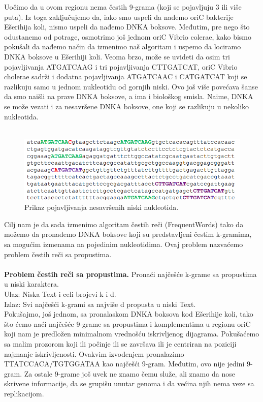 Uočimo da u ovom regionu nema čestih 9-grama (koji se pojavljuju 3 ili više puta). Iz toga zaključujemo da, iako smo uspeli da nađemo oriC bakterije Ešerihija koli, nismo uspeli da nađemo DNKA boksove. Međutim, pre nego što odustanemo od potrage, osmotrimo još jednom oriC Vibrio colerae, kako bismo pokušali da nađemo način da izmenimo naš algoritam i uspemo da lociramo DNKA boksove u Ešerihiji koli. Veoma brzo, može se uvideti da osim tri pojavljivanja ATGATCAAG i tri pojavljivanja CTTGATCAT, oriC Vibrio cholerae sadrži i dodatna pojavljivanja ATGATCAAC i CATGATCAT koji se razlikuju samo u jednom nukleotidu od gornjih niski. Ovo još više povećava šanse da smo naišli na prave DNKA boksove, a ima i biološkog smisla. Naime, DNKA se može vezati i za nesavršene DNKA boksove, one koji se razlikuju u nekoliko nukleotida.\\\\


\begin{figure}[h]
\caption{Prikaz pojavljivanja nesavršenih niski nukleotida.}
\centering
\includegraphics[width=1\textwidth]{poglavlja/1/slike/nesavrseni1.png}
\end{figure} 

Cilj nam je da sada izmenimo algoritam čestih reči (FrequentWords) tako da možemo da pronađemo DNKA boksove koji su predstavljeni čestim k-gramima, sa mogućim izmenama na pojedinim nukleotidima. Ovaj problem nazvaćemo problem čestih reči sa propustima.\\\\
\textbf{Problem čestih reči sa propustima.} Pronaći najčešće k-grame sa
propustima u niski karaktera.\\
Ulaz: Niska Text i celi brojevi k i d.\\
Izlaz: Svi najčešći k-grami sa najviše d propusta u niski Text. \\

Pokušajmo, još jednom, sa pronalaskom DNKA boksova kod Ešerihije koli, tako što ćemo naći najčešće 9-grame sa propustima i komplementima u regionu oriC koji nam je predložen minimalnom vrednošću iskrivljenog dijagrama. Pokušaćemo sa malim prozorom koji ili počinje ili se završava ili je centriran na poziciji najmanje iskrivljenosti. Ovakvim izvođenjem pronalazimo TTATCCACA/TGTGGATAA kao najčešći 9-gram. Međutim, ovo nije jedini 9-gram. Za ostale 9-grame još uvek ne znamo čemu služe, ali znamo da nose skrivene informacije, da se grupišu unutar genoma i da većina njih nema veze sa replikacijom. 

